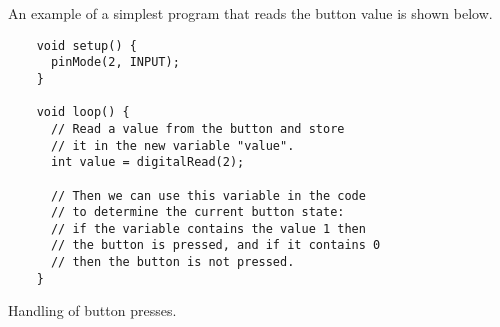 \documentclass[../sparc.tex]{subfiles}
\begin{document}
An example of a simplest program that reads the button value is shown below.

\begin{listing}[H]
  \begin{verbatim}
    void setup() {
      pinMode(2, INPUT);
    }

    void loop() {
      // Read a value from the button and store
      // it in the new variable "value".
      int value = digitalRead(2);

      // Then we can use this variable in the code
      // to determine the current button state:
      // if the variable contains the value 1 then
      // the button is pressed, and if it contains 0
      // then the button is not pressed.
    }
  \end{verbatim}
  \caption{Handling of button presses.}
  \label{listing:button-00}
\end{listing}
\end{document}
